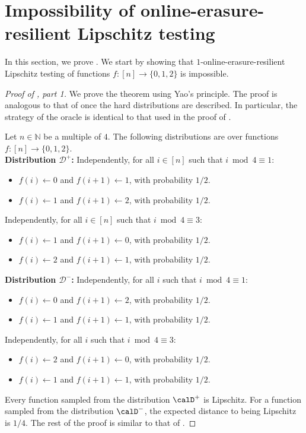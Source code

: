 \documentclass{toc}
\begin{document}
\section{Impossibility of online-erasure-resilient Lipschitz testing}\label{sec:lipschitz}
In this section, we prove .
%
We start by showing that $1$-online-erasure-resilient Lipschitz testing  of functions $f:[n] \to \{0,1,2\}$ is impossible. 
\begin{proof}[Proof of , part 1]
We prove the theorem using Yao's principle. The proof is analogous to that of 
once the hard distributions are described. In particular, the strategy of the oracle is identical to that used in the proof of .

Let $n \in \mathbb{N}$ be a multiple of $4$. The following distributions are over functions $f:[n] \to \{0,1,2\}$. \\


\noindent\textbf{Distribution $\mathcal{D}^+$:} Independently, for all $i \in[n]$ such that $i \bmod 4 \equiv 1$:
\begin{itemize}
    \item $f(i) \gets 0$ and $f(i+1) \gets 1$, with probability $1/2$.
    \item $f(i) \gets 1$ and $f(i+1) \gets 2$, with probability $1/2$.
\end{itemize}
Independently, for all $i \in[n]$ such that $i \bmod 4 \equiv 3$:
\begin{itemize}
    \item $f(i) \gets 1$ and $f(i+1) \gets 0$, with probability $1/2$.
    \item $f(i) \gets 2$ and $f(i+1) \gets 1$, with probability $1/2$.
\end{itemize}

\noindent\textbf{Distribution $\mathcal{D}^-$:} Independently, for all $i$ such that $i \bmod 4 \equiv 1$:
\begin{itemize}
    \item $f(i) \gets 0$ and $f(i+1) \gets 2$, with probability $1/2$.
    \item $f(i) \gets 1$ and $f(i+1) \gets 1$, with probability $1/2$.
\end{itemize}
Independently, for all $i$ such that $i \bmod 4 \equiv 3$:
\begin{itemize}
    \item $f(i) \gets 2$ and $f(i+1) \gets 0$, with probability $1/2$.
    \item $f(i) \gets 1$ and $f(i+1) \gets 1$, with probability $1/2$.
\end{itemize}

Every function sampled from the distribution  $\calD^+$ is Lipschitz. For a function sampled from the distribution $\calD^-$, the expected distance to being Lipschitz is $1/4$.
The rest of the proof is similar to that of .
\end{proof}
\end{document}

